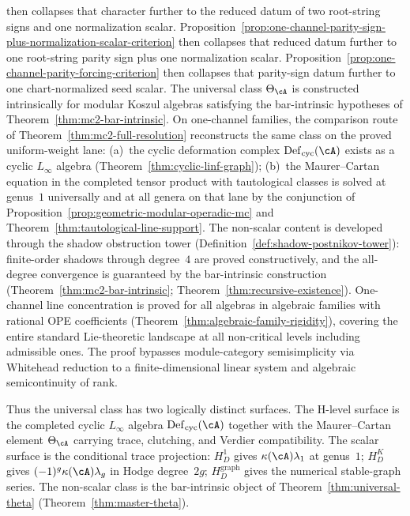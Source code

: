 \begin{remark}[Scope]
then collapses that character further to the reduced datum of two
root-string signs and one normalization scalar.
Proposition~\ref{prop:one-channel-parity-sign-plus-normalization-scalar-criterion}
then collapses that reduced datum further to one root-string parity
sign plus one normalization scalar.
Proposition~\ref{prop:one-channel-parity-forcing-criterion}
then collapses that parity-sign datum further to one chart-normalized
seed scalar.
The universal class $\Theta_{\cA}$ is constructed intrinsically
for modular Koszul algebras satisfying the bar-intrinsic hypotheses
of Theorem~\ref{thm:mc2-bar-intrinsic}. On one-channel families,
the comparison route of
Theorem~\ref{thm:mc2-full-resolution} reconstructs the same class on
the proved uniform-weight lane: (a)~the cyclic deformation complex
$\operatorname{Def}_{\mathrm{cyc}}(\cA)$ exists as a cyclic
$L_\infty$ algebra (Theorem~\ref{thm:cyclic-linf-graph});
(b)~the Maurer--Cartan equation in the completed tensor product with
tautological classes is solved at genus~$1$ universally and at all
genera on that lane by the conjunction of
Proposition~\ref{prop:geometric-modular-operadic-mc} and
Theorem~\ref{thm:tautological-line-support}.
The non-scalar content is developed through the shadow
obstruction tower
(Definition~\ref{def:shadow-postnikov-tower}): finite-order
shadows through degree~$4$ are proved constructively, and the
all-degree convergence is guaranteed by the bar-intrinsic
construction (Theorem~\ref{thm:mc2-bar-intrinsic};
Theorem~\ref{thm:recursive-existence}).
One-channel line concentration is proved
for all algebras in algebraic families with rational OPE
coefficients (Theorem~\ref{thm:algebraic-family-rigidity}),
covering the entire standard Lie-theoretic landscape at
all non-critical levels including admissible ones.
The proof bypasses module-category semisimplicity via
Whitehead reduction to a finite-dimensional linear system
and algebraic semicontinuity of rank.

Thus the universal class has two logically distinct surfaces. The
H-level surface is the completed cyclic $L_\infty$ algebra
$\operatorname{Def}_{\mathrm{cyc}}(\cA)$ together with the
Maurer--Cartan element $\Theta_\cA$ carrying trace, clutching, and
Verdier compatibility.  The scalar surface is the conditional trace
projection: $H_D^1$ gives $\kappa(\cA)\lambda_1$ at genus~$1$;
$H_D^K$ gives $(-1)^g\kappa(\cA)\lambda_g$ in Hodge degree~$2g$;
$H_D^{\mathrm{graph}}$ gives the numerical stable-graph series. The
non-scalar class is the bar-intrinsic object of
Theorem~\ref{thm:universal-theta}
\textup{(}Theorem~\ref{thm:master-theta}\textup{)}.


\end{remark}
